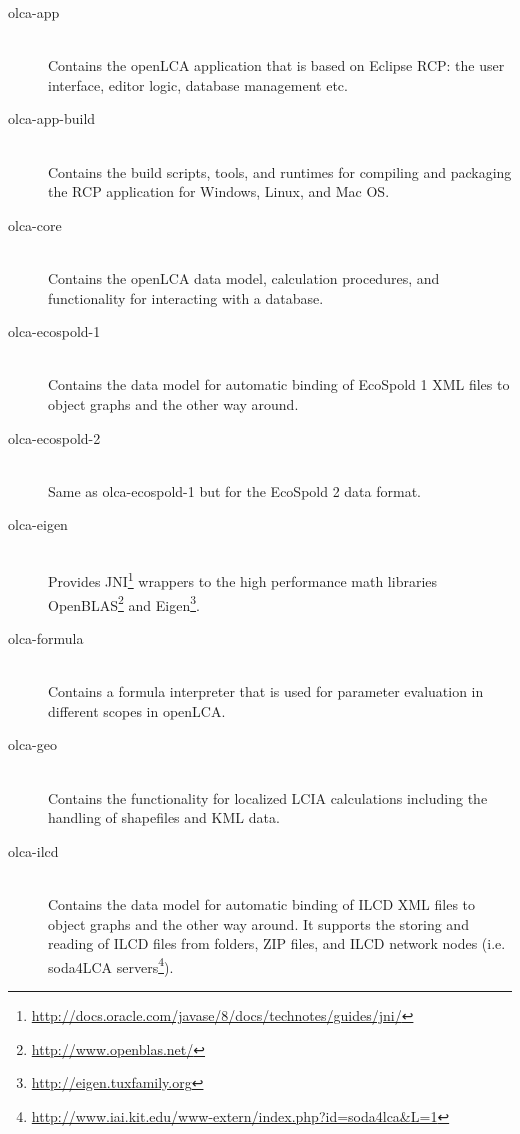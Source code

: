 \documentclass{scrreprt}
\begin{document}
\begin{description}
  \item[olca-app] \hfill \\
  Contains the openLCA application that is based on Eclipse RCP: the user interface, editor logic, database management etc.
   
  \item[olca-app-build] \hfill \\
  Contains the build scripts, tools, and runtimes for compiling and packaging the RCP application for Windows, Linux, and Mac OS.
  
  \item[olca-core] \hfill \\
  Contains the openLCA data model, calculation procedures, and functionality for interacting with a database.
  
  \item[olca-ecospold-1] \hfill \\
  Contains the data model for automatic binding of EcoSpold 1 XML files to object graphs and the other way around.
  
  \item[olca-ecospold-2] \hfill \\
  Same as olca-ecospold-1 but for the EcoSpold 2 data format.
  
  \item[olca-eigen] \hfill \\
  Provides JNI\footnote{\url{http://docs.oracle.com/javase/8/docs/technotes/guides/jni/}} wrappers to the high performance math libraries OpenBLAS\footnote{\url{http://www.openblas.net/}} and Eigen\footnote{\url{http://eigen.tuxfamily.org}}.
  
  \item[olca-formula] \hfill \\
  Contains a formula interpreter that is used for parameter evaluation in different scopes in openLCA. 
  
  \item[olca-geo] \hfill \\
  Contains the functionality for localized LCIA calculations including the handling of shapefiles and KML data.
  
  \item[olca-ilcd] \hfill \\
  Contains the data model for automatic binding of ILCD XML files to object graphs and the other way around. It supports the storing and reading of ILCD files from folders, ZIP files, and ILCD network nodes (i.e. soda4LCA servers\footnote{\url{http://www.iai.kit.edu/www-extern/index.php?id=soda4lca&L=1}}).
  

\end{description}
\end{document}
